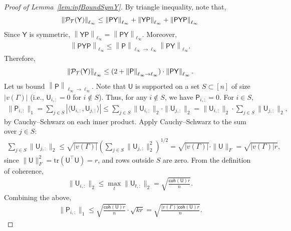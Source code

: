 \documentclass[12pt]{article}
\newcommand{\calP}{{\cal P}}
\newcommand{\calT}{{\cal T}}
\newcommand{\norm}[1]{\left\|#1\right\|}
\newcommand{\s}[1]{\mathsf{#1}}
\begin{document}
\begin{proof}[Proof of Lemma~\ref{lem:infBoundSymY}]
By triangle inequality, note that,
\begin{align}
\norm{\calP_{\calT}(\s{Y})}_{\ell_\infty} \leq \norm{\s{P}\s{Y}}_{\ell_\infty}+\norm{\s{Y}\s{P}}_{\ell_\infty}+\norm{\s{P}\s{Y}\s{P}}_{\ell_\infty}
\end{align}
Since $\s{Y}$ is symmetric, $\norm{\s{Y}\s{P}}_{\ell_\infty} = \norm{\s{P}\s{Y}}_{\ell_\infty}$. Moreover,
\begin{align}
\norm{\s{P}\s{Y}\s{P}}_{\ell_\infty} \leq\norm{\s{P}}_{\ell_\infty \to \ell_\infty} \norm{\s{P}\s{Y}}_{\ell_\infty}.
\end{align}
Therefore,
\begin{align}
\norm{\calP_{\calT}(\s{Y})}_{\ell_\infty} \leq (2 + \norm{\s{P}}_{\ell_\infty \to \ell_\infty}) \cdot \norm{\s{P}\s{Y}}_{\ell_\infty}.\label{eqn:boundLLP0}
\end{align}
Let us bound $\norm{\s{P}}_{\ell_\infty \to \ell_\infty}$. Note that $\mathsf{U}$ is supported on a set $S \subset [n]$ of size $|v(\Gamma)|$ (i.e., $\mathsf{U}_{i,:} = 0$ for $i \notin S$). Thus, for any $i \notin S$, we have $\mathsf{P}_{i,:} = 0$. For $i \in S$,
\begin{align}
\| \mathsf{P}_{i,:} \|_1 = \sum_{j \in S} | \langle \mathsf{U}_{i,:}, \mathsf{U}_{j,:} \rangle |
\leq \sum_{j \in S} \| \mathsf{U}_{i,:} \|_2 \cdot \| \mathsf{U}_{j,:} \|_2
= \| \mathsf{U}_{i,:} \|_2 \cdot \sum_{j \in S} \| \mathsf{U}_{j,:} \|_2,
\end{align}
by Cauchy--Schwarz on each inner product. Apply Cauchy--Schwarz to the sum over $ j \in S $:
\begin{align}
\sum_{j \in S} \| \mathsf{U}_{j,:} \|_2
\leq \sqrt{|v(\Gamma)|} \left( \sum_{j \in S} \| \mathsf{U}_{j,:} \|_2^2 \right)^{1/2}
= \sqrt{|v(\Gamma)|} \cdot \| \mathsf{U} \|_F
= \sqrt{|v(\Gamma)| r},
\end{align}
since $ \| \mathsf{U} \|_F^2 = \mathrm{tr}( \mathsf{U}^\top \mathsf{U} ) = r $, and rows outside $ S $ are zero. From the definition of coherence,
\begin{align}
\| \mathsf{U}_{i,:} \|_2 \leq \max_t \| \mathsf{U}_{t,:} \|_2 = \sqrt{ \frac{\s{coh}(\s{U})r}{n} }.
\end{align}
Combining the above,
\begin{align}
\| \mathsf{P}_{i,:} \|_1 \leq \sqrt{ \frac{\s{coh}(\s{U})r}{n} } \cdot \sqrt{k r}
= \sqrt{ \frac{|v(\Gamma)| \s{coh}(\s{U})r}{n} }.

\end{align}
\end{proof}
\end{document}
